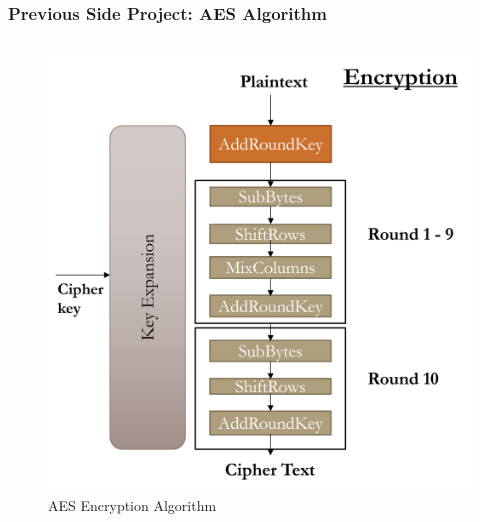 \documentclass[
	11pt, %
	hmargin=1cm,vmargin=0cm,head=0.5cm,headsep=0pt,foot=0.5cm,margin=2cm
]{beamer}
\begin{document}
\begin{frame}
	\frametitle{Previous Side Project: AES Algorithm}
	\begin{columns}[c] %
		
		\begin{column}{0.45\textwidth} %
			\begin{figure}
				\includegraphics[width=\textwidth]{aes_encryption.png}
				\caption{AES Encryption Algorithm}
			\end{figure}
		\end{column}

		\pause


\end{columns}
\end{frame}
\end{document}
